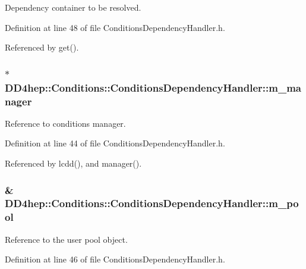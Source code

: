 Dependency container to be resolved. 

Definition at line 48 of file ConditionsDependencyHandler.h.

Referenced by get().\hypertarget{class_d_d4hep_1_1_conditions_1_1_conditions_dependency_handler_a9c245445c4fd8c00c7e80ff67eb1ab3a}{
\subsubsection[{m\_\-manager}]{$\ast$ {\bf DD4hep::Conditions::ConditionsDependencyHandler::m\_\-manager}}}
\label{class_d_d4hep_1_1_conditions_1_1_conditions_dependency_handler_a9c245445c4fd8c00c7e80ff67eb1ab3a}


Reference to conditions manager. 

Definition at line 44 of file ConditionsDependencyHandler.h.

Referenced by lcdd(), and manager().\hypertarget{class_d_d4hep_1_1_conditions_1_1_conditions_dependency_handler_a71ec45fb6d8dabbf7e055687ab8bea5a}{
\subsubsection[{m\_\-pool}]{\& {\bf DD4hep::Conditions::ConditionsDependencyHandler::m\_\-pool}}}
\label{class_d_d4hep_1_1_conditions_1_1_conditions_dependency_handler_a71ec45fb6d8dabbf7e055687ab8bea5a}


Reference to the user pool object. 

Definition at line 46 of file ConditionsDependencyHandler.h.

